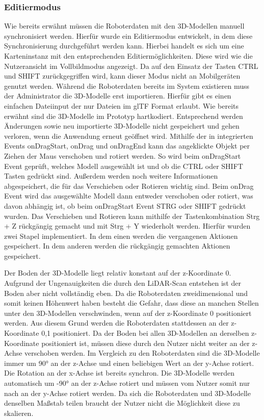 \subsubsection{Editiermodus}
Wie bereits erwähnt müssen die Roboterdaten mit den 3D-Modellen manuell synchronisiert werden. Hierfür wurde ein Editiermodus entwickelt, in dem diese Synchronisierung durchgeführt werden kann. Hierbei handelt es sich um eine \deckgl{} Karteninstanz mit den entsprechenden Editiermöglichkeiten. Diese wird wie die Nutzeransicht im Vollbildmodus angezeigt. Da auf den Einsatz der Tasten CTRL und SHIFT zurückgegriffen wird, kann dieser Modus nicht an Mobilgeräten genutzt werden.
Während die Roboterdaten bereits im System existieren muss der Administrator die 3D-Modelle erst importieren. Hierfür gibt es einen einfachen Dateiinput der nur Dateien im \ac{glTF} Format erlaubt. Wie bereits erwähnt sind die 3D-Modelle im Prototyp hartkodiert. Entsprechend werden Änderungen sowie neu importierte 3D-Modelle nicht gespeichert und gehen verloren, wenn die Anwendung erneut geöffnet wird.
Mithilfe der in \deckgl{} integrierten Events onDragStart, onDrag und onDragEnd kann das angeklickte Objekt per Ziehen der Maus verschoben und rotiert werden. So wird beim onDragStart Event geprüft, welches Modell ausgewählt ist und ob die CTRL oder SHIFT Tasten gedrückt sind. Außerdem werden noch weitere Informationen abgespeichert, die für das Verschieben oder Rotieren wichtig sind. Beim onDrag Event wird das ausgewählte Modell dann entweder verschoben oder rotiert, was davon abhängig ist, ob beim onDragStart Event STRG oder SHIFT gedrückt wurden. Das Verschieben und Rotieren kann mithilfe der Tastenkombination Strg + Z rückgängig gemacht und mit Strg + Y wiederholt werden. Hierfür wurden zwei Stapel implementiert. In dem einen werden die vergangenen Aktionen gespeichert. In dem anderen werden die rückgängig gemachten Aktionen gespeichert.

Der Boden der 3D-Modelle liegt relativ konstant auf der z-Koordinate 0. Aufgrund der Ungenauigkeiten die durch den \ac{LiDAR}-Scan entstehen ist der Boden aber nicht vollständig eben. Da die Roboterdaten zweidimensional und somit keinen Höhenwert haben besteht die Gefahr, dass diese an manchen Stellen unter den 3D-Modellen verschwinden, wenn auf der z-Koordinate 0 positioniert werden. Aus diesem Grund werden die Roboterdaten stattdessen an der z-Koordinate 0,1 positioniert. Da der Boden bei allen 3D-Modellen an derselben z-Koordinate positioniert ist, müssen diese durch den Nutzer nicht weiter an der z-Achse verschoben werden. Im Vergleich zu den Roboterdaten sind die 3D-Modelle immer um 90° an der z-Achse und einen beliebigen Wert an der y-Achse rotiert. Die Rotation an der x-Achse ist bereits synchron. Die 3D-Modelle werden automatisch um -90° an der z-Achse rotiert und müssen vom Nutzer somit nur nach an der y-Achse rotiert werden. Da sich die Roboterdaten und 3D-Modelle denselben Maßstab teilen braucht der Nutzer nicht die Möglichkeit diese zu skalieren.

